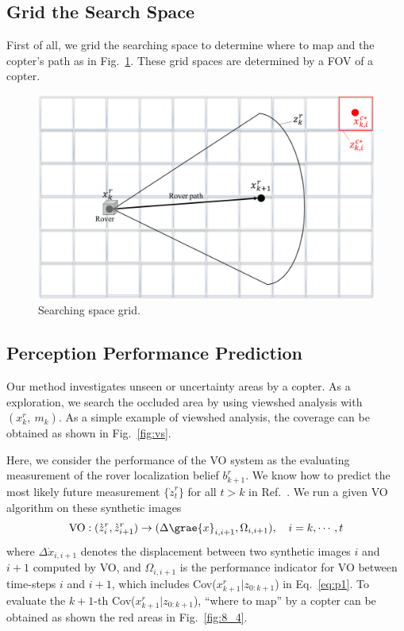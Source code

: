 \documentclass[conference]{IEEEtran}
\begin{document}
\subsection{Grid the Search Space}
First of all, we grid the searching space to determine where to map and the copter's path as in Fig.~\ref{fig:8_3}. These grid spaces are determined by a FOV of a copter.
\begin{figure}[b]
		\centering
		\includegraphics[width=1.0\columnwidth]{figs/8_3.png}
		\caption{Searching space grid.}
		\label{fig:8_3}
\end{figure}
\subsection{Perception Performance Prediction}
Our method investigates unseen or uncertainty areas by a copter. As a exploration, we search the occluded area by using viewshed analysis with $(x^r_k,~m_k)$. As a simple example of viewshed analysis, the coverage can be obtained as shown in Fig.~\ref{fig:vs}.

Here, we consider the performance of the VO system as the evaluating measurement of the rover localization belief $b^r_{k+1}$. We know how to predict the most likely future measurement $\{ \grave{z}^r_t \}$ for all $t>k$ in Ref.~\cite{IEEE:Kyon}. We run a given VO algorithm on these synthetic images
\begin{align}
    {\rm VO}: (\grave{z}^r_i,\grave{z}^r_{i+1}) \to (\Delta \grae{x}_{i,i+1},\Omega_{i,i+1}),\quad i=k,\cdots,t
\end{align}
where $\Delta \grave{x}_{i,i+1}$ denotes the displacement between two synthetic images $i$ and $i+1$ computed by VO, and $\Omega_{i,i+1}$ is the performance indicator for VO between time-steps $i$ and $i+1$, which includes Cov($x^{r}_{k+1} | z_{0:k+1}$) in Eq.~\eqref{eq:p1}. To evaluate the $k+1$-th Cov($x^{r}_{k+1} | z_{0:k+1}$), ``where to map'' by a copter can be obtained as shown the red areas in Fig.~\ref{fig:8_4}.
\end{document}
